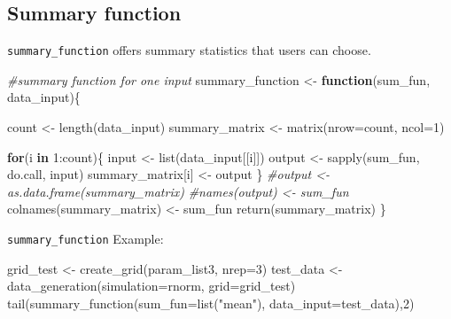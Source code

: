 \documentclass[11pt,a4paper]{article}
\newenvironment{Shaded}{\begin{snugshade}}{\end{snugshade}}
\newcommand{\AttributeTok}[1]{\textcolor[rgb]{0.77,0.63,0.00}{#1}}
\newcommand{\CommentTok}[1]{\textcolor[rgb]{0.56,0.35,0.01}{\textit{#1}}}
\newcommand{\ControlFlowTok}[1]{\textcolor[rgb]{0.13,0.29,0.53}{\textbf{#1}}}
\newcommand{\DecValTok}[1]{\textcolor[rgb]{0.00,0.00,0.81}{#1}}
\newcommand{\FunctionTok}[1]{\textcolor[rgb]{0.00,0.00,0.00}{#1}}
\newcommand{\NormalTok}[1]{#1}
\newcommand{\OtherTok}[1]{\textcolor[rgb]{0.56,0.35,0.01}{#1}}
\newcommand{\SpecialCharTok}[1]{\textcolor[rgb]{0.00,0.00,0.00}{#1}}
\newcommand{\StringTok}[1]{\textcolor[rgb]{0.31,0.60,0.02}{#1}}
\begin{document}
\hypertarget{summary-function}{%
\subsection{Summary function}\label{summary-function}}

\texttt{summary\_function} offers summary statistics that users can
choose.

\begin{Shaded}
\begin{Highlighting}[]
\CommentTok{\#summary function for one input}
\NormalTok{summary\_function }\OtherTok{\textless{}{-}} \ControlFlowTok{function}\NormalTok{(sum\_fun, data\_input)\{}
  
\NormalTok{  count }\OtherTok{\textless{}{-}} \FunctionTok{length}\NormalTok{(data\_input)}
\NormalTok{  summary\_matrix }\OtherTok{\textless{}{-}} \FunctionTok{matrix}\NormalTok{(}\AttributeTok{nrow=}\NormalTok{count, }\AttributeTok{ncol=}\DecValTok{1}\NormalTok{)}
  
  \ControlFlowTok{for}\NormalTok{(i }\ControlFlowTok{in} \DecValTok{1}\SpecialCharTok{:}\NormalTok{count)\{}
\NormalTok{    input }\OtherTok{\textless{}{-}} \FunctionTok{list}\NormalTok{(data\_input[[i]])}
\NormalTok{    output }\OtherTok{\textless{}{-}} \FunctionTok{sapply}\NormalTok{(sum\_fun, do.call, input)}
\NormalTok{    summary\_matrix[i] }\OtherTok{\textless{}{-}}\NormalTok{ output}
\NormalTok{  \}}
  \CommentTok{\#output \textless{}{-} as.data.frame(summary\_matrix)}
  \CommentTok{\#names(output) \textless{}{-} sum\_fun}
  \FunctionTok{colnames}\NormalTok{(summary\_matrix) }\OtherTok{\textless{}{-}}\NormalTok{ sum\_fun}
  \FunctionTok{return}\NormalTok{(summary\_matrix)}
\NormalTok{\}}
\end{Highlighting}
\end{Shaded}

\texttt{summary\_function} Example:

\begin{Shaded}
\begin{Highlighting}[]
\NormalTok{grid\_test }\OtherTok{\textless{}{-}} \FunctionTok{create\_grid}\NormalTok{(param\_list3, }\AttributeTok{nrep=}\DecValTok{3}\NormalTok{)}
\NormalTok{test\_data }\OtherTok{\textless{}{-}} \FunctionTok{data\_generation}\NormalTok{(}\AttributeTok{simulation=}\NormalTok{rnorm, }\AttributeTok{grid=}\NormalTok{grid\_test)}
\FunctionTok{tail}\NormalTok{(}\FunctionTok{summary\_function}\NormalTok{(}\AttributeTok{sum\_fun=}\FunctionTok{list}\NormalTok{(}\StringTok{"mean"}\NormalTok{), }\AttributeTok{data\_input=}\NormalTok{test\_data),}\DecValTok{2}\NormalTok{)}
\end{Highlighting}
\end{Shaded}
\end{document}
